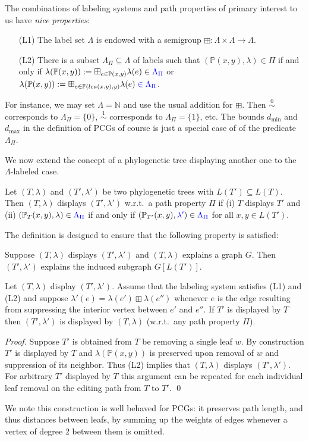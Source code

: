 \documentclass[smallextended]{svjour3}
\newcommand{\rev}[1]{\begingroup\color{blue}#1\endgroup}
\newcommand{\Ro}{\mathrel{\overset{0}{\sim}}}
\newcommand{\Rl}{\mathrel{\overset{1}{\sim}}}
\newcommand{\lca}[1]{\mathop{lca}(#1)}
\begin{document}
The combinations of labeling systems and path properties of primary
interest to us have \emph{nice properties}:
\begin{itemize}
\item[(L1)] The label set $\Lambda$ is endowed with a semigroup $\boxplus:
  \Lambda\times\Lambda\to\Lambda$.
\item[(L2)] There is a subset $\Lambda_{\Pi}\subseteq\Lambda$ of labels
  such that $(\mathbb{P}(x,y),\lambda) \in \Pi$ if and only if
  $\lambda(\mathbb{P}(x,y)):=\boxplus_{e\in\mathbb{P}(x,y)}\lambda(e) \in
  \rev{\Lambda_{\Pi}}$ or
  $\lambda(\mathbb{P}(x,y)):=\boxplus_{e\in\mathbb{P}(\lca{x,y},y)}\lambda(e)
  \rev{\in \Lambda_{\Pi}}$.
\end{itemize}
For instance, we may set $\Lambda=\mathbb{N}$ and use the usual addition
for $\boxplus$. Then $\Ro$ corresponds to $\Lambda_{\Pi}=\{0\}$, $\Rl$
corresponds to $\Lambda_{\Pi}=\{1\}$, etc. \rev{The bounds $d_{\min}$ and
  $d_{\max}$ in the definition of PCGs of course is just a special case of
  of the predicate $\Lambda_{\Pi}$.}

We now extend the concept of a \rev{phylogenetic tree} displaying another
one to the $\Lambda$-labeled case.
\begin{definition}
  Let $(T,\lambda)$ and $(T',\lambda')$ be two \rev{phylogenetic trees}
  with $L(T')\subseteq L(T)$. Then $(T,\lambda)$ displays $(T',\lambda')$
  \rev{w.r.t.\ a path property $\Pi$} if (i) $T$ displays $T'$ and (ii)
  $(\mathbb{P}_{T}(x,y),\lambda) \in \rev{\Lambda_{\Pi}}$ if and only if
  $(\mathbb{P}_{T'}(x,y),\rev{\lambda'}) \in \rev{\Lambda_{\Pi}}$ for all
  $x,y\in L(T')$.
\end{definition} 
The definition is designed to ensure that the following property is satisfied:
\begin{lemma}
  Suppose $(T,\lambda)$ displays $(T',\lambda')$ and $(T,\lambda)$ explains
  a graph $G$. Then $(T',\lambda')$ explains the induced subgraph
  $G[L(T')]$.
\end{lemma}

\begin{lemma} 
  Let $(T,\lambda)$ display $(T',\lambda')$.  Assume that the labeling
  system satisfies (L1) and (L2) and suppose
  $\lambda'(e)=\lambda(e')\boxplus\lambda(e'')$ whenever $e$ is the edge
  resulting from suppressing the interior vertex between $e'$ and $e''$.
  If $T'$ is displayed by $T$ then $(T',\lambda')$ is displayed by
  $(T,\lambda)$ \rev{(w.r.t.\ any path property $\Pi$).}
\end{lemma}
\begin{proof} 
  Suppose $T'$ is obtained from $T$ be removing a single leaf $w$. By
  construction $T'$ is displayed by $T$ and $\lambda(\mathbb{P}(x,y))$ is
  preserved upon removal of $w$ and suppression of its neighbor. Thus  
  (L2) implies that $(T,\lambda)$ displays $(T',\lambda')$. For arbitrary 
  $T'$ displayed by $T$ this argument can be repeated for each individual
  leaf removal on the editing path from $T$ to $T'$. \qed
\end{proof}
\rev{We note this construction is well behaved for PCGs: it preserves path
  length, and thus distances between leafs, by summing up the weights of
  edges whenever a vertex of degree 2 between them is omitted.}
\end{document}
